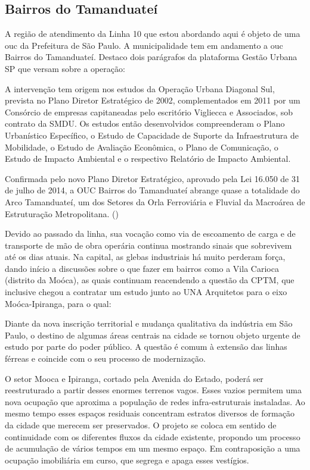 \documentclass[11pt,fleqn]{book} %
\begin{document}
\subsection{Bairros do Tamanduateí}

A região de atendimento da Linha 10 que estou abordando aqui é objeto de uma \gls{ouc} da Prefeitura de São Paulo. A municipalidade tem em andamento a \gls{ouc} Bairros do Tamanduateí. Destaco dois parágrafos da plataforma Gestão Urbana SP que versam sobre a operação:

\begin{citacao}
	A intervenção tem origem nos estudos da Operação Urbana Diagonal Sul, prevista no Plano Diretor Estratégico de 2002, complementados em 2011 por um Consórcio de empresas capitaneadas pelo escritório Vigliecca e Associados, sob contrato da SMDU. Os estudos então desenvolvidos compreenderam o Plano Urbanístico Específico, o Estudo de Capacidade de Suporte da Infraestrutura de Mobilidade, o Estudo de Avaliação Econômica, o Plano de Comunicação, o Estudo de Impacto Ambiental e o respectivo Relatório de Impacto Ambiental.
	
	Confirmada pelo novo Plano Diretor Estratégico, aprovado pela Lei 16.050 de 31 de julho de 2014, a OUC Bairros do Tamanduateí abrange quase a totalidade do Arco Tamanduateí, um dos Setores da Orla Ferroviária e Fluvial da Macroárea de Estruturação Metropolitana.
	(\cite{smdu})
\end{citacao}

Devido ao passado da linha, sua vocação como via de escoamento de carga e de transporte de mão de obra operária continua mostrando sinais que sobrevivem até os dias atuais. Na capital, as glebas industriais há muito perderam força, dando início a discussões sobre o que fazer em bairros como a Vila Carioca (distrito da Moóca), as quais continuam reacendendo a questão da CPTM, que inclusive chegou a contratar um estudo junto ao UNA Arquitetos para o eixo Moóca-Ipiranga, para o qual:

\begin{citacao}
	Diante da nova inscrição territorial e mudança qualitativa da indústria em São Paulo, o destino de algumas áreas centrais na cidade se tornou objeto urgente de estudo por parte do poder público. A questão é comum à extensão das linhas férreas e coincide com o seu processo de modernização.
	
	O setor Mooca e Ipiranga, cortado pela Avenida do Estado, poderá ser reestruturado a partir desses enormes terrenos vagos. Esses vazios permitem uma nova ocupação que aproxima a população de redes infra-estruturais instaladas. Ao mesmo tempo esses espaços residuais concentram estratos diversos de formação da cidade que merecem ser preservados. O projeto se coloca em sentido de continuidade com os diferentes fluxos da cidade existente, propondo um processo de acumulação de vários tempos em um mesmo espaço. Em contraposição a uma ocupação imobiliária em curso, que segrega e apaga esses vestígios.
	\cite{unaarq}
\end{citacao}
\end{document}
